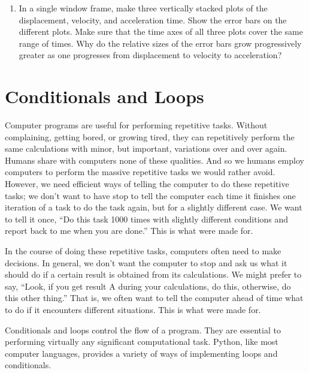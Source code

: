 \documentclass[letterpaper,10pt,english]{sphinxmanual}
\begin{document}
\begin{enumerate}
\begin{enumerate}
\item {} 
\sphinxAtStartPar
In a single window frame, make three vertically stacked plots of the displacement, velocity, and acceleration  time.  Show the error bars on the different plots.  Make sure that the time axes of all three plots cover the same range of times. Why do the relative sizes of the error bars grow progressively greater as one progresses from displacement to velocity to acceleration?

\end{enumerate}

\end{enumerate}

\sphinxstepscope


\chapter{Conditionals and Loops}
\label{\detokenize{chap6/chap6_loopsconds:conditionals-and-loops}}\label{\detokenize{chap6/chap6_loopsconds:chap6}}\label{\detokenize{chap6/chap6_loopsconds::doc}}
\sphinxAtStartPar
Computer programs are useful for performing repetitive tasks.  Without complaining, getting bored, or growing tired, they can repetitively perform the same calculations with minor, but important, variations over and over again.  Humans share with computers none of these qualities.  And so we humans employ computers to perform the massive repetitive tasks we would rather avoid. However, we need efficient ways of telling the computer to do these repetitive tasks; we don’t want to have stop to tell the computer each time it finishes one iteration of a task to do the task again, but for a slightly different case.  We want to tell it once, “Do this task 1000 times with slightly different conditions and report back to me when you are done.”  This is what  were made for.

\sphinxAtStartPar
In the course of doing these repetitive tasks, computers often need to make decisions.  In general, we don’t want the computer to stop and ask us what it should do if a certain result is obtained from its calculations.  We might prefer to say,  “Look, if you get result A during your calculations, do this, otherwise, do this other thing.”  That is, we often want to tell the computer ahead of time what to do if it encounters different situations.  This is what  were made for.

\sphinxAtStartPar
Conditionals and loops control the flow of a program.  They are essential to performing virtually any significant computational task.  Python, like most computer languages, provides a variety of ways of implementing loops and conditionals.
\end{document}
